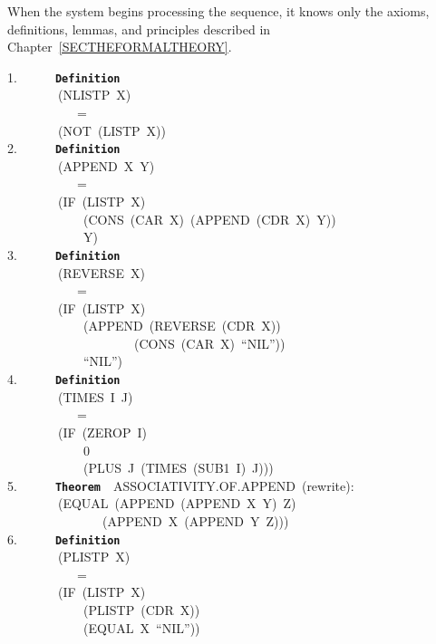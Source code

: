 \documentclass[11pt]{book}
\newenvironment{pubasis}{\begin{flushleft}\ttfamily\small}{\normalsize\rmfamily\end{flushleft}}
\newcommand{\axiomordefinition}[1]{\vspace{6pt}\texttt{\textbf{#1}}}
\begin{document}
When the system begins processing the sequence, it knows only the axioms,
definitions, lemmas, and principles described in Chapter~\ref{SECTHEFORMALTHEORY}.
\begin{pubasis}
1.~~~~~~\axiomordefinition{Definition}\\
~~~~~~~~(NLISTP~X)\\
~~~~~~~~~~~=\\
~~~~~~~~(NOT~(LISTP~X))\\

2.~~~~~~\axiomordefinition{Definition}\\
~~~~~~~~(APPEND~X~Y)\\
~~~~~~~~~~~=\\
~~~~~~~~(IF~(LISTP~X)\\
~~~~~~~~~~~~(CONS~(CAR~X)~(APPEND~(CDR~X)~Y))\\
~~~~~~~~~~~~Y)\\

3.~~~~~~\axiomordefinition{Definition}\\
~~~~~~~~(REVERSE~X)\\
~~~~~~~~~~~=\\
~~~~~~~~(IF~(LISTP~X)\\
~~~~~~~~~~~~(APPEND~(REVERSE~(CDR~X))\\
~~~~~~~~~~~~~~~~~~~~(CONS~(CAR~X)~``NIL''))\\
~~~~~~~~~~~~``NIL'')\\

4.~~~~~~\axiomordefinition{Definition}\\
~~~~~~~~(TIMES~I~J)\\
~~~~~~~~~~~=\\
~~~~~~~~(IF~(ZEROP~I)\\
~~~~~~~~~~~~0\\
~~~~~~~~~~~~(PLUS~J~(TIMES~(SUB1~I)~J)))\\

5.~~~~~~\axiomordefinition{Theorem}~~ASSOC\-IATIV\-ITY.OF.APPEND~(rewrite):\\
~~~~~~~~(EQUAL~(APPEND~(APPEND~X~Y)~Z)\\
~~~~~~~~~~~~~~~(APPEND~X~(APPEND~Y~Z)))\\

6.~~~~~~\axiomordefinition{Definition}\\
~~~~~~~~(PLISTP~X)\\
~~~~~~~~~~~=\\
~~~~~~~~(IF~(LISTP~X)\\
~~~~~~~~~~~~(PLISTP~(CDR~X))\\
~~~~~~~~~~~~(EQUAL~X~``NIL''))\\


\end{pubasis}
\end{document}
